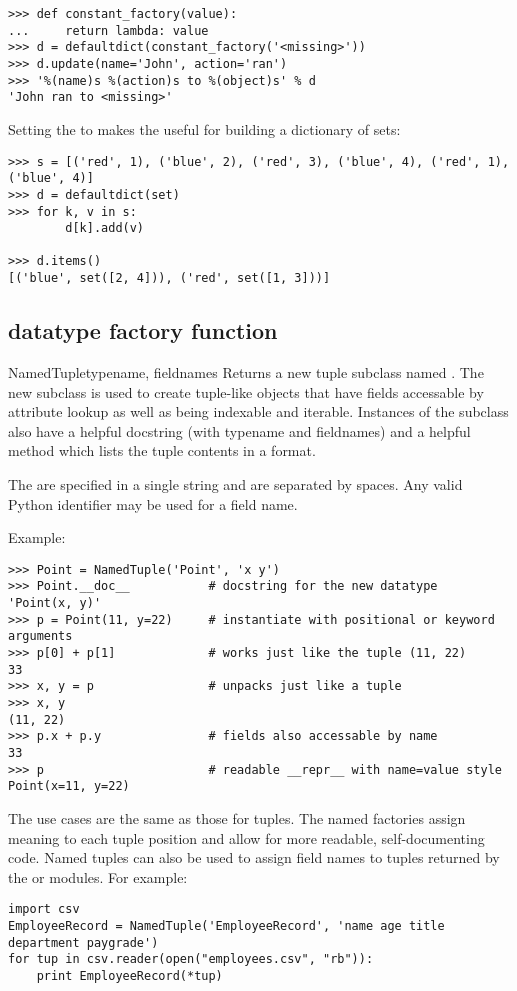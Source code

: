 \begin{verbatim}
>>> def constant_factory(value):
...     return lambda: value
>>> d = defaultdict(constant_factory('<missing>'))
>>> d.update(name='John', action='ran')
>>> '%(name)s %(action)s to %(object)s' % d
'John ran to <missing>'
\end{verbatim}

Setting the  to  makes the
 useful for building a dictionary of sets:

\begin{verbatim}
>>> s = [('red', 1), ('blue', 2), ('red', 3), ('blue', 4), ('red', 1), ('blue', 4)]
>>> d = defaultdict(set)
>>> for k, v in s:
        d[k].add(v)

>>> d.items()
[('blue', set([2, 4])), ('red', set([1, 3]))]
\end{verbatim}



\subsection{ datatype factory function \label{named-tuple-factory}}

\begin{funcdesc}{NamedTuple}{typename, fieldnames}
  Returns a new tuple subclass named .  The new subclass is used
  to create tuple-like objects that have fields accessable by attribute
  lookup as well as being indexable and iterable.  Instances of the subclass
  also have a helpful docstring (with typename and fieldnames) and a helpful
   method which lists the tuple contents in a 
  format.

  The  are specified in a single string and are separated by spaces.
  Any valid Python identifier may be used for a field name.

  Example:
  \begin{verbatim}
>>> Point = NamedTuple('Point', 'x y')
>>> Point.__doc__           # docstring for the new datatype
'Point(x, y)'
>>> p = Point(11, y=22)     # instantiate with positional or keyword arguments
>>> p[0] + p[1]             # works just like the tuple (11, 22)
33
>>> x, y = p                # unpacks just like a tuple
>>> x, y
(11, 22)
>>> p.x + p.y               # fields also accessable by name
33
>>> p                       # readable __repr__ with name=value style
Point(x=11, y=22)  
\end{verbatim}

  The use cases are the same as those for tuples.  The named factories
  assign meaning to each tuple position and allow for more readable,
  self-documenting code.  Named tuples can also be used to assign field names 
  to tuples
  returned by the  or  modules.  For example:

  \begin{verbatim}
import csv
EmployeeRecord = NamedTuple('EmployeeRecord', 'name age title department paygrade')
for tup in csv.reader(open("employees.csv", "rb")):
    print EmployeeRecord(*tup)
\end{verbatim}

\end{funcdesc}
